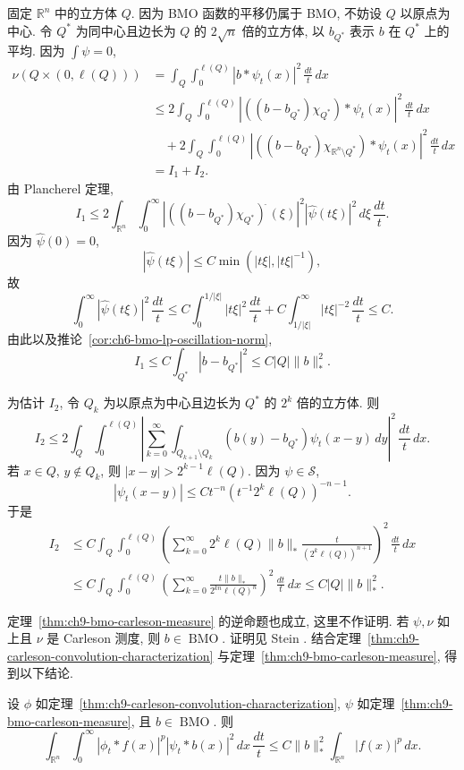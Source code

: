 \hypertarget{chapter-09-page-212}{}
\begin{Proof}
固定 $\mathbb R^n$ 中的立方体 $Q$. 因为 BMO 函数的平移仍属于 BMO, 不妨设 $Q$ 以原点为中心. 令 $Q^*$ 为同中心且边长为 $Q$ 的 $2\sqrt n$ 倍的立方体, 以 $b_{Q^*}$ 表示 $b$ 在 $Q^*$ 上的平均. 因为 $\int\psi=0$,
\[
 \begin{aligned}
 \nu(Q\times(0,\ell(Q)))
 &=\int_Q\int_0^{\ell(Q)}|b*\psi_t(x)|^2\,\frac{dt}{t}\,dx\\
 &\le2\int_Q\int_0^{\ell(Q)}
 |((b-b_{Q^*})\chi_{Q^*})*\psi_t(x)|^2\,\frac{dt}{t}\,dx\\
 &\quad+2\int_Q\int_0^{\ell(Q)}
 |((b-b_{Q^*})\chi_{\mathbb R^n\setminus Q^*})*\psi_t(x)|^2\,\frac{dt}{t}\,dx\\
 &=I_1+I_2.
 \end{aligned}
\]
由 Plancherel 定理,
\[
 I_1\le2\int_{\mathbb R^n}\int_0^\infty
 |((b-b_{Q^*})\chi_{Q^*})^{\widehat{\ }}(\xi)|^2
 |\widehat\psi(t\xi)|^2\,d\xi\,\frac{dt}{t}.
\]
因为 $\widehat\psi(0)=0$,
\[
 |\widehat\psi(t\xi)|\le C\min(|t\xi|,|t\xi|^{-1}),
\]
故
\[
 \int_0^\infty|\widehat\psi(t\xi)|^2\,\frac{dt}{t}
 \le C\int_0^{1/|\xi|}|t\xi|^2\,\frac{dt}{t}
 +C\int_{1/|\xi|}^\infty|t\xi|^{-2}\,\frac{dt}{t}\le C.
\]
由此以及推论~\ref{cor:ch6-bmo-lp-oscillation-norm},
\[
 I_1\le C\int_{Q^*}|b-b_{Q^*}|^2
 \le C|Q|\|b\|_*^2.
\]

为估计 $I_2$, 令 $Q_k$ 为以原点为中心且边长为 $Q^*$ 的 $2^k$ 倍的立方体. 则
\[
 I_2\le2\int_Q\int_0^{\ell(Q)}
 \left|\sum_{k=0}^\infty\int_{Q_{k+1}\setminus Q_k}
 (b(y)-b_{Q^*})\psi_t(x-y)\,dy\right|^2\,\frac{dt}{t}\,dx.
\]
若 $x\in Q$, $y\notin Q_k$, 则 $|x-y|>2^{k-1}\ell(Q)$. 因为 $\psi\in\mathcal S$,
\[
 |\psi_t(x-y)|\le Ct^{-n}(t^{-1}2^k\ell(Q))^{-n-1}.
\]
于是
\[
 \begin{aligned}
 I_2
 &\le C\int_Q\int_0^{\ell(Q)}
 \left(\sum_{k=0}^\infty2^k\ell(Q)\|b\|_*
 \frac{t}{(2^k\ell(Q))^{n+1}}\right)^2\,\frac{dt}{t}\,dx\\
 &\le C\int_Q\int_0^{\ell(Q)}
 \left(\sum_{k=0}^\infty\frac{t\|b\|_*}{2^{kn}\ell(Q)^n}\right)^2\,\frac{dt}{t}\,dx
 \le C|Q|\|b\|_*^2.
 \end{aligned}
\]
\end{Proof}

\hypertarget{chapter-09-page-213}{}
定理~\ref{thm:ch9-bmo-carleson-measure} 的逆命题也成立, 这里不作证明. 若 $\psi,\nu$ 如上且 $\nu$ 是 Carleson 测度, 则 $b\in\operatorname{BMO}$. 证明见 Stein . 结合定理~\ref{thm:ch9-carleson-convolution-characterization} 与定理~\ref{thm:ch9-bmo-carleson-measure}, 得到以下结论.

\begin{Corollary}
\label{cor:ch9-carleson-bmo-embedding}
设 $\phi$ 如定理~\ref{thm:ch9-carleson-convolution-characterization}, $\psi$ 如定理~\ref{thm:ch9-bmo-carleson-measure}, 且 $b\in\operatorname{BMO}$. 则
\[
 \int_{\mathbb R^n}\int_0^\infty
 |\phi_t*f(x)|^p|\psi_t*b(x)|^2\,dx\,\frac{dt}{t}
 \le C\|b\|_*^2\int_{\mathbb R^n}|f(x)|^p\,dx.
\]
\end{Corollary}
